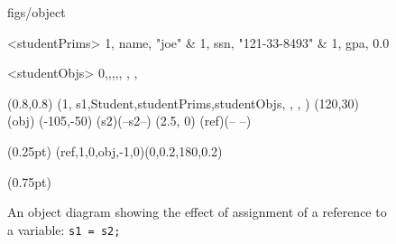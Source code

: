 





\begin {figure}


\Draw

 {figs/object}

\Indirect \Table <studentPrims>
{  
   1, name, "joe" 		&
   1, ssn,  "121-33-8493"		&
   1, gpa,  0.0			
}


\Indirect \Table <studentObjs>
 {  0,,,,, , , }
  


\Scale (0.8,0.8)
\Obj (1, s1,Student,studentPrims,studentObjs, , , )
\Move(120,30)
\FcNode(obj)
\Move(-105,-50)
\Node(s2)(--s2--)
\MoveToExit(2.5, 0)
\ORectNode(ref)(-- --)

\PenSize(0.25pt)
\CurvedEdgeAt(ref,1,0,obj,-1,0)(0,0.2,180,0.2)


\PenSize(0.75pt)


\EndDraw

\caption {An object diagram showing the effect of assignment
of a reference to a variable: \texttt{s1 = s2;}}

\label {fig:assignRef2}

\end {figure}


